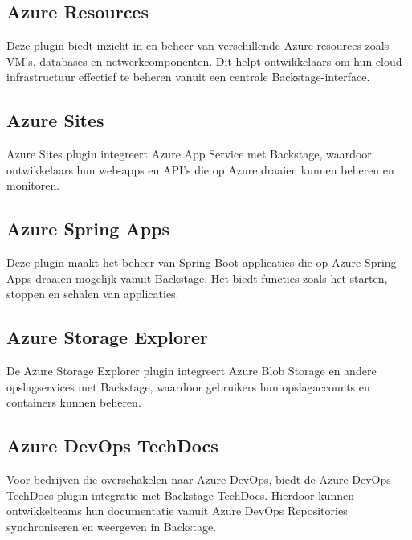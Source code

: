 \subsection{Azure Resources}

Deze plugin biedt inzicht in en beheer van verschillende Azure-resources zoals VM's, databases en netwerkcomponenten. Dit helpt ontwikkelaars om hun cloud-infrastructuur effectief te beheren vanuit een centrale Backstage-interface.

\subsection{Azure Sites}

Azure Sites plugin integreert Azure App Service met Backstage, waardoor ontwikkelaars hun web-apps en API's die op Azure draaien kunnen beheren en monitoren.

\subsection{Azure Spring Apps}

Deze plugin maakt het beheer van Spring Boot applicaties die op Azure Spring Apps draaien mogelijk vanuit Backstage. Het biedt functies zoals het starten, stoppen en schalen van applicaties.

\subsection{Azure Storage Explorer}

De Azure Storage Explorer plugin integreert Azure Blob Storage en andere opslagservices met Backstage, waardoor gebruikers hun opslagaccounts en containers kunnen beheren.

\subsection{Azure DevOps TechDocs}

Voor bedrijven die overschakelen naar Azure DevOps, biedt de Azure DevOps TechDocs plugin integratie met Backstage TechDocs. Hierdoor kunnen ontwikkelteams hun documentatie vanuit Azure DevOps Repositories synchroniseren en weergeven in Backstage.